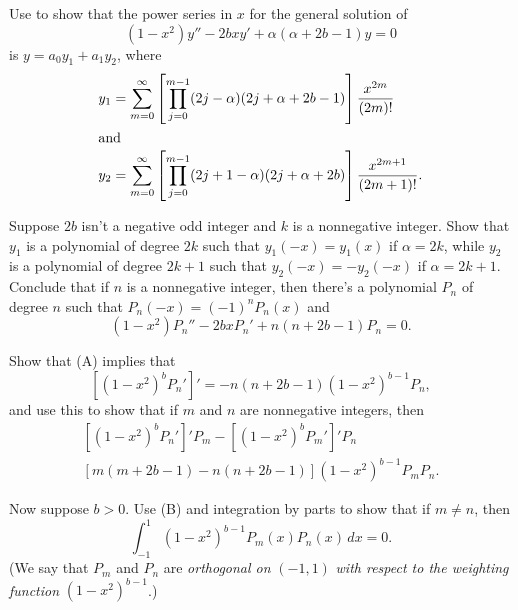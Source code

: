 \begin{exerciselist}
\item\label{exer:7.2.30}\begin{alist}
\item %
Use   to show that the power series in $x$
for the general solution of
\[
(1-x^2)y''-2bxy'+\alpha(\alpha+2b-1)y=0
\]
is $y=a_0y_1+a_1y_2$, where
\begin{align*}
y_1&=\sum_{m=0}^\infty \left[\prod_{j=0}^{m-1}(2j-\alpha)(2j+\alpha+2b-1)
\right]\frac{x^{2m}}{(2m)!}\\
\shortintertext{and}
y_2&=\sum_{m=0}^\infty \left[\prod_{j=0}^{m-1}(2j+1-\alpha)(2j+\alpha+2b)
\right]\frac{x^{2m+1}}{(2m+1)!}.
\end{align*}
\item %
Suppose $2b$ isn't  a negative odd integer and $k$ is a
nonnegative integer. Show that $y_1$ is a polynomial of degree $2k$
such that $y_1(-x)=y_1(x)$ if $\alpha=2k$, while $y_2$ is a polynomial
of degree $2k+1$ such that $y_2(-x)=-y_2(-x)$ if $\alpha=2k+1$.
Conclude that if $n$ is a nonnegative integer, then there's a
polynomial $P_n$ of degree $n$ such that $P_n(-x)=(-1)^nP_n(x)$ and
\[
(1-x^2)P_n''-2bxP_n'+n(n+2b-1)P_n=0.
\tag{A}
\]
\item %
Show that (A) implies that
\[
[(1-x^2)^b P_n']'=-n(n+2b-1)(1-x^2)^{b-1}P_n,
\]
and use this to show that if $m$ and $n$ are nonnegative integers, then
\[
\begin{multlined}
[(1-x^2)^bP_n']'P_m-[(1-x^2)^bP_m']'P_n\\
\left[m(m+2b-1)-n(n+2b-1)\right](1-x^2)^{b-1}P_mP_n.
\end{multlined}
\tag{B}
\]
\item %
Now suppose   $b>0$.
Use (B) and integration by parts to show that
if $m\ne n$, then
\[
\int_{-1}^1 (1-x^2)^{b-1}P_m(x)P_n(x)\,dx=0.
\]
(We say  that $P_m$ and $P_n$ are \emph{\color{blue}orthogonal on}
$(-1,1)$ \emph{\color{blue}with respect to the weighting function}
$(1-x^2)^{b-1}$.)
\end{alist}



\end{exerciselist}
